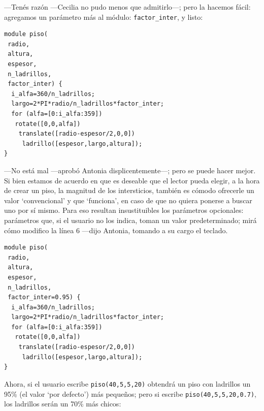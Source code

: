   ---Tenés razón ---Cecilia no pudo menos que ad\-mi\-tir\-lo---; pero
  la hacemos fácil: agregamos un parámetro más al módulo:
  \lstinline!factor_inter!, y listo:

    \begin{lstlisting}
module piso(
 radio,
 altura,
 espesor,
 n_ladrillos,
 factor_inter) {
  i_alfa=360/n_ladrillos;
  largo=2*PI*radio/n_ladrillos*factor_inter; 
  for (alfa=[0:i_alfa:359])
   rotate([0,0,alfa])
    translate([radio-espesor/2,0,0])
     ladrillo([espesor,largo,altura]); 
}
    \end{lstlisting}

    ---No está mal ---aprobó Antonia displicentemente---; pero se
    puede hacer mejor. Si bien estamos de acuerdo en que es deseable
    que el lector pueda elegir, a la hora de crear un piso, la
    magnitud de los intersticios, también es cómodo ofrecerle un valor
    `convencional' y que `funciona', en caso de que no quiera ponerse
    a buscar uno por sí mismo. Para eso resultan insustituibles los
    parámetros opcionales: parámetros que, si el usuario no los
    indica, toman un valor predeterminado; mirá cómo modifico la línea
    6 ---dijo Antonia, tomando a su cargo el teclado.

    \begin{lstlisting}
module piso(
 radio,
 altura,
 espesor,
 n_ladrillos,
 factor_inter=0.95) {
  i_alfa=360/n_ladrillos;
  largo=2*PI*radio/n_ladrillos*factor_inter; 
  for (alfa=[0:i_alfa:359])
   rotate([0,0,alfa])
    translate([radio-espesor/2,0,0])
     ladrillo([espesor,largo,altura]); 
}
    \end{lstlisting}

\guillemotright Ahora, si el usuario escribe \lstinline!piso(40,5,5,20)!
  obtendrá un piso con ladrillos un 95\% (el valor `por defecto') más
  pequeños; pero si escribe \lstinline!piso(40,5,5,20,0.7)!, los ladrillos
  serán un 70\% más chicos:


